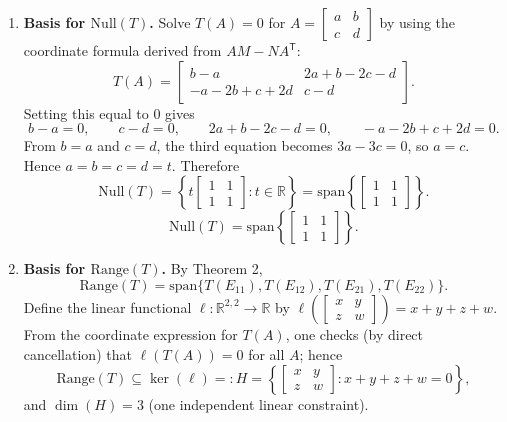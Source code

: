 \documentclass[12pt]{article}
\newcommand{\R}{\mathbb{R}}
\begin{document}
\begin{enumerate}[label=(\alph*)]
\item \textbf{Basis for $\mathrm{Null}(T)$.}
Solve $T(A)=0$ for $A=\begin{bmatrix}a&b\\c&d\end{bmatrix}$ by using the coordinate formula derived from $AM-NA^{\mathsf T}$:
\[
T(A)=\begin{bmatrix}
b-a & 2a+b-2c-d\\
-a-2b+c+2d & c-d
\end{bmatrix}.
\]
Setting this equal to $0$ gives
\[
b-a=0,\qquad c-d=0,\qquad 2a+b-2c-d=0,\qquad -a-2b+c+2d=0.
\]
From $b=a$ and $c=d$, the third equation becomes $3a-3c=0$, so $a=c$. Hence $a=b=c=d=t$.
Therefore
\[
\mathrm{Null}(T)=\left\{t\begin{bmatrix}1&1\\1&1\end{bmatrix}:t\in\R\right\}
=\mathrm{span}\left\{\begin{bmatrix}1&1\\1&1\end{bmatrix}\right\}.
\]
\[
\boxed{\,\mathrm{Null}(T)=\mathrm{span}\left\{\begin{bmatrix}1&1\\1&1\end{bmatrix}\right\}.\,}
\]

\item \textbf{Basis for $\mathrm{Range}(T)$.}
By Theorem 2,
\[
\mathrm{Range}(T)=\mathrm{span}\{T(E_{11}),T(E_{12}),T(E_{21}),T(E_{22})\}.
\]
Define the linear functional $\ell:\R^{2,2}\to\R$ by $\ell\!\left(\begin{bmatrix}x&y\\z&w\end{bmatrix}\right)=x+y+z+w$.
From the coordinate expression for $T(A)$, one checks (by direct cancellation) that $\ell(T(A))=0$ for all $A$; hence
\[
\mathrm{Range}(T)\subseteq \ker(\ell)=:H=\left\{\begin{bmatrix}x&y\\z&w\end{bmatrix}:x+y+z+w=0\right\},
\]
and $\dim(H)=3$ (one independent linear constraint).


\end{enumerate}
\end{document}

